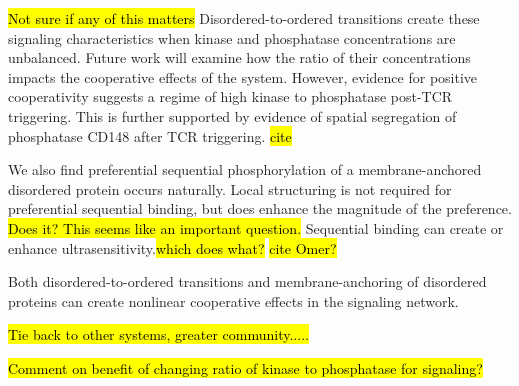 \documentclass[../../AdvancementSummary.tex]{subfiles}
\begin{document}
\hl{Not sure if any of this matters}
Disordered-to-ordered transitions create these signaling characteristics when kinase and phosphatase concentrations are unbalanced. Future work will examine how the ratio of their concentrations impacts the cooperative effects of the system. However, evidence for positive cooperativity suggests a regime of high kinase to phosphatase post-TCR triggering. This is further supported by evidence of spatial segregation of phosphatase CD148 after TCR triggering. \hl{cite} 

We also find preferential sequential phosphorylation of a membrane-anchored disordered protein occurs naturally. Local structuring is not required for preferential sequential binding, but does enhance the magnitude of the preference. \hl{Does it?  This seems like an important question.} Sequential binding can create or enhance ultrasensitivity.\hl{which does what?} \hl{cite Omer?}

Both disordered-to-ordered transitions and membrane-anchoring of disordered proteins can create nonlinear cooperative effects in the signaling network. 

\hl{Tie back to other systems, greater community.....} 



\hl{Comment on benefit of changing ratio of kinase to phosphatase for signaling?}


\end{document}
